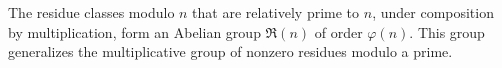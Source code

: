 The residue classes modulo $n$ that are relatively prime to $n$, under composition by multiplication, form an Abelian group $\mathfrak{R}(n)$ of order $\varphi(n)$. This group generalizes the multiplicative group of nonzero residues modulo a prime.
